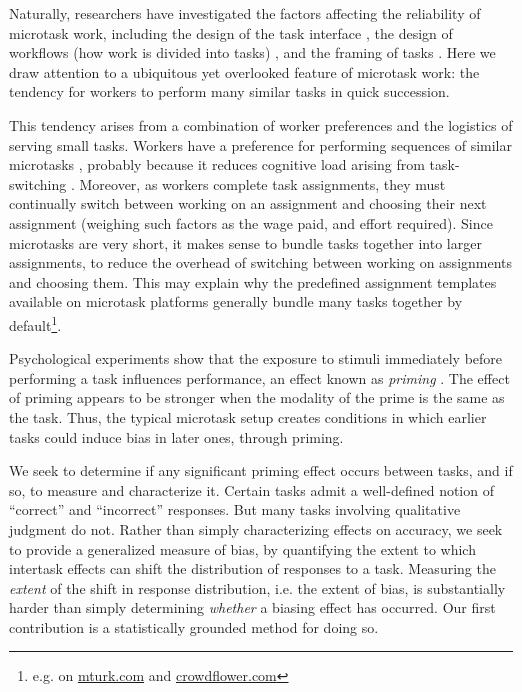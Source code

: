 \documentclass{sigchi}
\begin{document}
Naturally, researchers have investigated the factors affecting the 
reliability of microtask work, including the design of the task interface
\cite{Finnerty2013},
the design of workflows (how work is divided into tasks)
\cite{kittur2011crowdforge,Huang201077,laseckieffects},
and the framing of tasks
\cite{Kinnaird2012281,chandler2013breaking,thibodeau2013natural}.
Here we draw attention to a ubiquitous yet overlooked feature of microtask 
work: the tendency for workers to perform many similar tasks in quick 
succession.  

This tendency arises from a combination of worker preferences and the 
logistics of serving small tasks.  
Workers have a preference for performing sequences of similar microtasks
\cite{Chilton20101}, probably because it reduces 
cognitive load arising from task-switching \cite{Adamczyk2004271}.
Moreover, as workers complete task assignments, they must continually 
switch between working on an assignment and choosing their next 
assignment (weighing such factors as the wage paid, and effort required).  
Since microtasks are very short,
it makes sense to bundle tasks together into
larger assignments, to reduce the overhead of switching between  
working on assignments and choosing them.
This may explain why the predefined assignment templates available on 
microtask platforms generally bundle many tasks together by 
default\footnote{e.g. on \url{mturk.com} and \url{crowdflower.com}}.

Psychological experiments show that the exposure to stimuli immediately 
before performing a task influences performance, an effect known as 
\textit{priming} \cite{BJOP1796}.
The effect of priming appears to be stronger when the modality of the
prime is the same as the task.
Thus, the typical microtask setup creates conditions in which
earlier tasks could induce bias in later ones, through priming.

We seek to determine if any significant priming effect occurs between
tasks, and if so, to measure and characterize it.
Certain tasks admit a well-defined notion of ``correct'' and 
``incorrect'' responses.  But many tasks involving qualitative judgment
do not.  Rather than simply characterizing effects on accuracy, we seek
to provide a generalized measure of bias, by quantifying the
extent to which intertask effects can shift the distribution of responses 
to a task.  
Measuring the \textit{extent} of the shift in response distribution,
i.e. the extent of bias, is substantially harder than
simply determining \textit{whether} a biasing effect has occurred.  
Our first contribution is a statistically grounded method for doing so.
\end{document}
